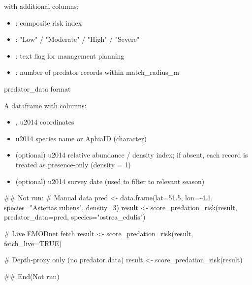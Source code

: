 \documentclass[a4paper]{book}
\begin{document}
%
\begin{Value}
 with additional columns:
\begin{itemize}

\item{}  : composite risk index
\item{} : "Low" / "Moderate" / "High" / "Severe"
\item{} : text flag for management planning
\item{} : number of predator records within match\_radius\_m

\end{itemize}

\end{Value}
%
\begin{Section}{predator\_data format}

A dataframe with columns:
\begin{itemize}

\item{} ,  \bsl{}u2014 coordinates
\item{}  \bsl{}u2014 species name or AphiaID (character)
\item{}  (optional) \bsl{}u2014 relative abundance / density index; if absent,
each record is treated as presence-only (density = 1)
\item{}  (optional) \bsl{}u2014 survey date (used to filter to relevant season)

\end{itemize}

\end{Section}
%
\begin{Examples}
\begin{ExampleCode}
## Not run: 
# Manual data
pred <- data.frame(lat=51.5, lon=-4.1, species="Asterias rubens", density=3)
result <- score_predation_risk(result, predator_data=pred, species="ostrea_edulis")

# Live EMODnet fetch
result <- score_predation_risk(result, fetch_live=TRUE)

# Depth-proxy only (no predator data)
result <- score_predation_risk(result)

## End(Not run)
\end{ExampleCode}
\end{Examples}
\end{document}
